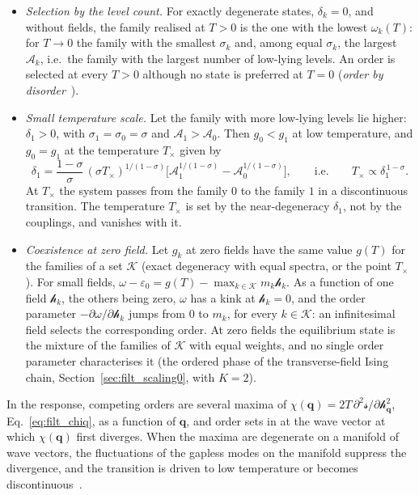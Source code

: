 \documentclass[10pt,a4paper]{article}
\theoremstyle{plain}
\newcommand{\hfield}{\mathscr{h}}  %
\newcommand{\lds}{\mathscr{s}}  %
\begin{document}
\begin{itemize}\setlength{\itemsep}{0pt}
\item \emph{Selection by the level count.} For exactly degenerate states,
  $\delta_k=0$, and without fields, the family realised at $T>0$ is the one
  with the lowest $\omega_k(T)$: for $T\to0$ the family with the smallest
  $\sigma_k$ and, among equal $\sigma_k$, the largest $\mathcal{A}_k$, i.e.\
  the family with the largest number of low-lying levels. An order is
  selected at every $T>0$ although no state is preferred at $T=0$
  (\emph{order by disorder}~\cite{Villain1980,Henley1989}).
\item \emph{Small temperature scale.} Let the family with more low-lying
  levels lie higher: $\delta_1>0$, with $\sigma_1=\sigma_0=\sigma$ and
  $\mathcal{A}_1>\mathcal{A}_0$. Then $g_0<g_1$ at low temperature, and
  $g_0=g_1$ at the temperature $T_\times$ given by
  \[
    \delta_1=\frac{1-\sigma}{\sigma}\,(\sigma T_\times)^{1/(1-\sigma)}
    \Big[\mathcal{A}_1^{1/(1-\sigma)}-\mathcal{A}_0^{1/(1-\sigma)}\Big] ,
    \qquad\text{i.e.}\qquad T_\times\propto\delta_1^{\,1-\sigma} .
  \]
  At $T_\times$ the system passes from the family $0$ to the family $1$ in a
  discontinuous transition. The temperature $T_\times$ is set by the
  near-degeneracy $\delta_1$, not by the couplings, and vanishes with it.
\item \emph{Coexistence at zero field.} Let $g_k$ at zero fields have the
  same value $g(T)$ for the families of a set $\mathcal K$ (exact degeneracy
  with equal spectra, or the point $T_\times$). For small fields,
  $\omega-\varepsilon_0=g(T)-\max_{k\in\mathcal K}m_k\hfield_k$. As a function
  of one field $\hfield_k$, the others being zero, $\omega$ has a kink at
  $\hfield_k=0$, and the order parameter $-\partial\omega/\partial \hfield_k$
  jumps from $0$ to $m_k$, for every $k\in\mathcal K$: an infinitesimal field
  selects the corresponding order. At zero fields the equilibrium state is
  the mixture of the families of $\mathcal K$ with equal weights, and no
  single order parameter characterises it (the ordered phase of the
  transverse-field Ising chain, Section~\ref{sec:filt_scaling0}, with
  $K=2$).
\end{itemize}
In the response, competing orders are several maxima of
$\chi(\mathbf q)=2T\,\partial^{2}\lds/\partial\hfield_{\mathbf q}^{2}$,
Eq.~\eqref{eq:filt_chiq}, as a function of $\mathbf q$, and order sets in at
the wave vector at which $\chi(\mathbf q)$ first diverges. When the maxima
are degenerate on a manifold of wave vectors, the fluctuations of the
gapless modes on the manifold suppress the divergence, and the transition is driven to low temperature or becomes
discontinuous~\cite{Brazovskii1975}.
\end{document}
